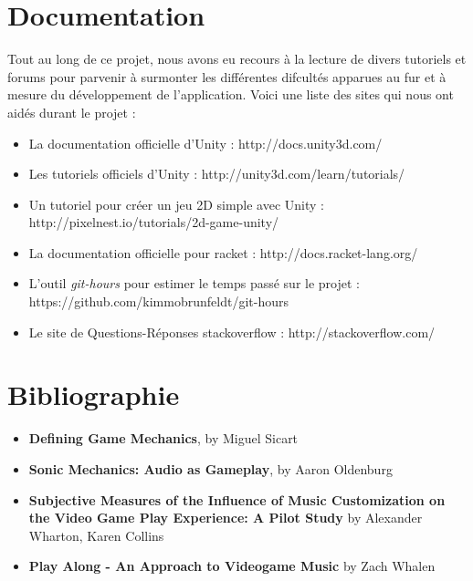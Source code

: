 \newpage

\section*{Documentation}
Tout au long de ce projet, nous avons eu recours à la lecture de divers tutoriels et forums pour parvenir à surmonter les différentes difcultés apparues au fur et à mesure du développement de l’application.
Voici une liste des sites qui nous ont aidés durant le projet :
\begin{itemize}
\item La documentation officielle d'Unity : http://docs.unity3d.com/
\item Les tutoriels officiels d'Unity : http://unity3d.com/learn/tutorials/
\item Un tutoriel pour créer un jeu 2D simple avec Unity : http://pixelnest.io/tutorials/2d-game-unity/
\item La documentation officielle pour racket : http://docs.racket-lang.org/
\item L'outil \textit{git-hours} pour estimer le temps passé sur le projet :  https://github.com/kimmobrunfeldt/git-hours
\item Le site de Questions-Réponses stackoverflow : http://stackoverflow.com/
\end{itemize}

\section*{Bibliographie}
\begin{itemize}
\item \textbf{Defining Game Mechanics}, by Miguel Sicart
\item \textbf{Sonic Mechanics: Audio as Gameplay}, by Aaron Oldenburg 
\item \textbf{Subjective Measures of the Influence of Music Customization on the Video Game Play Experience: A Pilot Study} by Alexander Wharton, Karen Collins
\item \textbf{Play Along - An Approach to Videogame Music} by Zach Whalen
\end{itemize}
